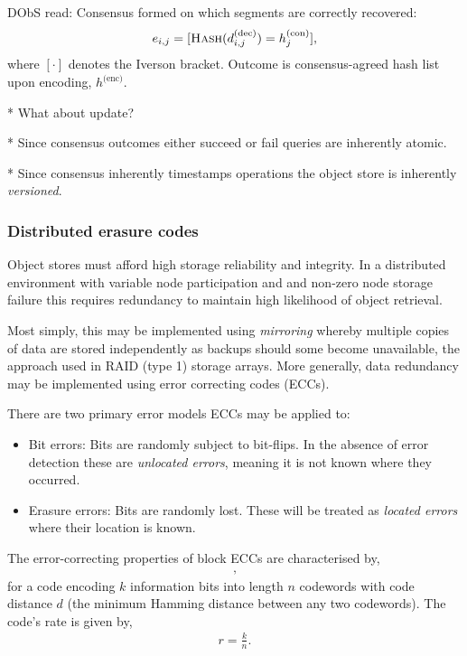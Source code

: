DObS read: Consensus formed on which segments are correctly recovered:
\begin{align}
	e_{i,j} = [\textsc{Hash}(d_{i,j}^\text{(dec)}) = h_j^\text{(con)}],
\end{align}
where $[\cdot]$ denotes the Iverson bracket. Outcome is consensus-agreed hash list upon encoding, $h^\text{(enc)}$.

* What about update?

* Since consensus outcomes either succeed or fail queries are inherently atomic.

* Since consensus inherently timestamps operations the object store is inherently \emph{versioned}.

\subsubsection{Distributed erasure codes}

Object stores must afford high storage reliability and integrity. In a distributed environment with variable node participation and and non-zero node storage failure this requires redundancy to maintain high likelihood of object retrieval.

Most simply, this may be implemented using \emph{mirroring} whereby multiple copies of data are stored independently as backups should some become unavailable, the approach used in RAID (type 1) storage arrays. More generally, data redundancy may be implemented using error correcting codes (ECCs).

There are two primary error models ECCs may be applied to:
\begin{itemize}
	\item Bit errors: Bits are randomly subject to bit-flips. In the absence of error detection these are \emph{unlocated errors}, meaning it is not known where they occurred.
	\item Erasure errors: Bits are randomly lost. These will be treated as \emph{located errors} where their location is known.
\end{itemize}

The error-correcting properties of block ECCs are characterised by,
\begin{align}
	[n,k,d],
\end{align}
for a code encoding $k$ information bits into length $n$ codewords with code distance $d$ (the minimum Hamming distance between any two codewords). The code's rate is given by,
\begin{align}
	r = \frac{k}{n}.
\end{align}

